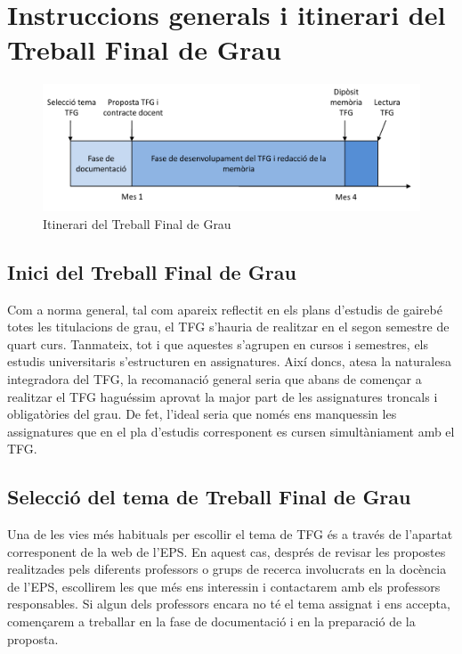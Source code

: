 
\chapter{Instruccions generals i itinerari del Treball Final de Grau }\label{instruccions}
\begin{figure}
\centering
\includegraphics[width=\linewidth]{Itinerari_TFG}
\caption{\label{fig:itinerari}Itinerari del Treball Final de Grau}
\end{figure}

\section{Inici del Treball Final de Grau}

Com a norma general, tal com apareix reflectit en els plans d'estudis de gairebé totes les titulacions de grau, el \ac{TFG} s'hauria de realitzar en el segon semestre de quart curs. Tanmateix, tot i que aquestes s'agrupen en cursos i semestres, els estudis universitaris s'estructuren en assignatures. Així doncs, atesa la naturalesa integradora del \ac{TFG}, la recomanació general seria que abans de començar a realitzar el \ac{TFG} haguéssim aprovat la major part de les assignatures troncals i obligatòries del grau. De fet, l'ideal seria que només ens manquessin les assignatures que en el pla d'estudis corresponent es cursen simultàniament amb el \ac{TFG}.

\section{Selecció del tema de Treball Final de Grau}

Una de les vies més habituals per escollir el tema de \ac{TFG} és a través de l'apartat corresponent de la web de l'\acf{EPS}. En aquest cas, després de revisar les propostes realitzades pels diferents professors o grups de recerca involucrats en la docència de l'\ac{EPS}, escollirem les que més ens interessin i contactarem amb els professors responsables. Si algun dels professors encara no té el tema assignat i ens accepta, començarem a treballar en la fase de documentació i en la preparació de la proposta.

